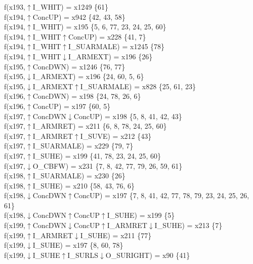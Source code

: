 f(x193,$\uparrow$I\_WHIT) = x1249 \{61\} \\  
f(x194,$\uparrow$ConcUP) = x942 \{42, 43, 58\} \\  
f(x194,$\uparrow$I\_WHIT) = x195 \{5, 6, 77, 23, 24, 25, 60\} \\  
f(x194,$\uparrow$I\_WHIT$\uparrow$ConcUP) = x228 \{41, 7\} \\  
f(x194,$\uparrow$I\_WHIT$\uparrow$I\_SUARMALE) = x1245 \{78\} \\  
f(x194,$\uparrow$I\_WHIT$\downarrow$I\_ARMEXT) = x196 \{26\} \\  
f(x195,$\uparrow$ConcDWN) = x1246 \{76, 77\} \\  
f(x195,$\downarrow$I\_ARMEXT) = x196 \{24, 60, 5, 6\} \\  
f(x195,$\downarrow$I\_ARMEXT$\uparrow$I\_SUARMALE) = x828 \{25, 61, 23\} \\  
f(x196,$\uparrow$ConcDWN) = x198 \{24, 78, 26, 6\} \\  
f(x196,$\uparrow$ConcUP) = x197 \{60, 5\} \\  
f(x197,$\uparrow$ConcDWN$\downarrow$ConcUP) = x198 \{5, 8, 41, 42, 43\} \\  
f(x197,$\uparrow$I\_ARMRET) = x211 \{6, 8, 78, 24, 25, 60\} \\  
f(x197,$\uparrow$I\_ARMRET$\uparrow$I\_SUVE) = x212 \{43\} \\  
f(x197,$\uparrow$I\_SUARMALE) = x229 \{79, 7\} \\  
f(x197,$\uparrow$I\_SUHE) = x199 \{41, 78, 23, 24, 25, 60\} \\  
f(x197,$\downarrow$O\_CBFW) = x231 \{7, 8, 42, 77, 79, 26, 59, 61\} \\  
f(x198,$\uparrow$I\_SUARMALE) = x230 \{26\} \\  
f(x198,$\uparrow$I\_SUHE) = x210 \{58, 43, 76, 6\} \\  
f(x198,$\downarrow$ConcDWN$\uparrow$ConcUP) = x197 \{7, 8, 41, 42, 77, 78, 79, 23, 24, 25, 26, 61\} \\  
f(x198,$\downarrow$ConcDWN$\uparrow$ConcUP$\uparrow$I\_SUHE) = x199 \{5\} \\  
f(x199,$\uparrow$ConcDWN$\downarrow$ConcUP$\uparrow$I\_ARMRET$\downarrow$I\_SUHE) = x213 \{7\} \\  
f(x199,$\uparrow$I\_ARMRET$\downarrow$I\_SUHE) = x211 \{77\} \\  
f(x199,$\downarrow$I\_SUHE) = x197 \{8, 60, 78\} \\  
f(x199,$\downarrow$I\_SUHE$\uparrow$I\_SURLS$\downarrow$O\_SURIGHT) = x90 \{41\} \\  
